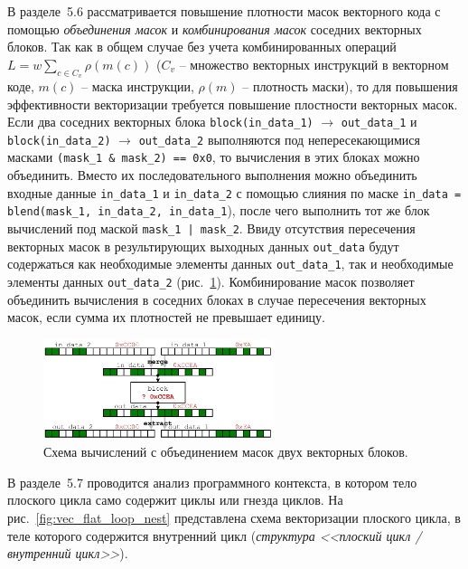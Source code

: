 \documentclass[a4paper,14pt]{extarticle}                     %
\theoremstyle{plain}                                         %
\begin{document}

В разделе~5.6 рассматривается повышение плотности масок векторного кода с помощью \textit{объединения масок} и \textit{комбинирования масок} соседних векторных блоков.
Так как в общем случае без учета комбинированных операций $L = w \sum_{c \in C_v}{\rho(m(c))}$ ($C_v$ -- множество векторных инструкций в векторном коде, $m(c)$ -- маска инструкции, $\rho(m)$ -- плотность маски), то для повышения эффективности векторизации требуется повышение плостности векторных масок.
Если два соседних векторных блока \texttt{block(in\_data\_1)} $\rightarrow$ \texttt{out\_data\_1} и \texttt{block(in\_data\_2)} $\rightarrow$ \texttt{out\_data\_2} выполняются под непересекающимися масками \texttt{(mask\_1 \& mask\_2) == 0x0}, то вычисления в этих блоках можно объединить.
Вместо их последовательного выполнения можно объединить входные данные \texttt{in\_data\_1} и \texttt{in\_data\_2} с помощью слияния по маске \texttt{in\_data = blend(mask\_1, in\_data\_2, in\_data\_1}), после чего выполнить тот же блок вычислений под маской \texttt{mask\_1 | mask\_2}.
Ввиду отсутствия пересечения векторных масок в результирующих выходных данных \texttt{out\_data} будут содержаться как необходимые элементы данных \texttt{out\_data\_1}, так и необходимые элементы данных \texttt{out\_data\_2} (рис.~\ref{fig:vec_unite_masks}).
Комбинирование масок позволяет объединить вычисления в соседних блоках в случае пересечения векторных масок, если сумма их плотностей не превышает единицу.

\begin{figure}[ht]
\centering
\includegraphics[width=0.6\textwidth]{./fig/vec_unite_masks.pdf}
\singlespacing
\caption{Схема вычислений с объединением масок двух векторных блоков.}
\label{fig:vec_unite_masks}
\end{figure}


В разделе~5.7 проводится анализ программного контекста, в котором тело плоского цикла само содержит циклы или гнезда циклов.
На рис.~\ref{fig:vec_flat_loop_nest} представлена схема векторизации плоского цикла, в теле которого содержится внутренний цикл (\textit{структура <<плоский цикл / внутренний цикл>>}).
\end{document}
